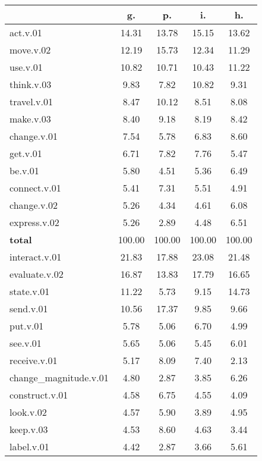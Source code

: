 \begin{table}[h!]
\begin{center}
\begin{tabular}{| l || c | c | c | c |}\hline
 & {\bf g.} & {\bf p.} & {\bf i.} & {\bf h.} \\\hline\hline
act.v.01 & 14.31  & 13.78  & 15.15  & 13.62 \\\hline
move.v.02 & 12.19  & 15.73  & 12.34  & 11.29 \\\hline
use.v.01 & 10.82  & 10.71  & 10.43  & 11.22 \\\hline
think.v.03 & 9.83  & 7.82  & 10.82  & 9.31 \\\hline
travel.v.01 & 8.47  & 10.12  & 8.51  & 8.08 \\\hline
make.v.03 & 8.40  & 9.18  & 8.19  & 8.42 \\\hline
change.v.01 & 7.54  & 5.78  & 6.83  & 8.60 \\\hline
get.v.01 & 6.71  & 7.82  & 7.76  & 5.47 \\\hline
be.v.01 & 5.80  & 4.51  & 5.36  & 6.49 \\\hline
connect.v.01 & 5.41  & 7.31  & 5.51  & 4.91 \\\hline
change.v.02 & 5.26  & 4.34  & 4.61  & 6.08 \\\hline
express.v.02 & 5.26  & 2.89  & 4.48  & 6.51 \\\hline\hline
{{\bf total}} & 100.00  & 100.00  & 100.00  & 100.00 \\\hline\hline\hline
interact.v.01 & 21.83  & 17.88  & 23.08  & 21.48 \\\hline
evaluate.v.02 & 16.87  & 13.83  & 17.79  & 16.65 \\\hline
state.v.01 & 11.22  & 5.73  & 9.15  & 14.73 \\\hline
send.v.01 & 10.56  & 17.37  & 9.85  & 9.66 \\\hline
put.v.01 & 5.78  & 5.06  & 6.70  & 4.99 \\\hline
see.v.01 & 5.65  & 5.06  & 5.45  & 6.01 \\\hline
receive.v.01 & 5.17  & 8.09  & 7.40  & 2.13 \\\hline
change\_magnitude.v.01 & 4.80  & 2.87  & 3.85  & 6.26 \\\hline
construct.v.01 & 4.58  & 6.75  & 4.55  & 4.09 \\\hline
look.v.02 & 4.57  & 5.90  & 3.89  & 4.95 \\\hline
keep.v.03 & 4.53  & 8.60  & 4.63  & 3.44 \\\hline
label.v.01 & 4.42  & 2.87  & 3.66  & 5.61 \\\hline\hline

\end{tabular}
\end{center}
\end{table}
